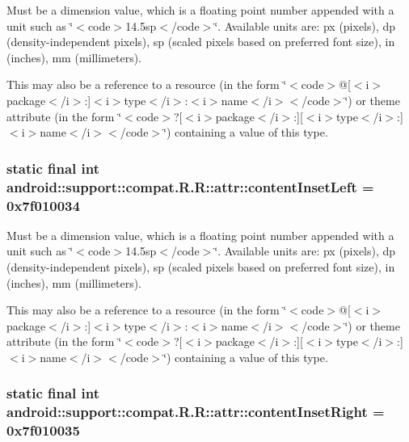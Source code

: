 Must be a dimension value, which is a floating point number appended with a unit such as \char`\"{}$<$code$>$14.5sp$<$/code$>$\char`\"{}. Available units are: px (pixels), dp (density-independent pixels), sp (scaled pixels based on preferred font size), in (inches), mm (millimeters). 

This may also be a reference to a resource (in the form \char`\"{}$<$code$>$@\mbox{[}$<$i$>$package$<$/i$>$:\mbox{]}$<$i$>$type$<$/i$>$:$<$i$>$name$<$/i$>$$<$/code$>$\char`\"{}) or theme attribute (in the form \char`\"{}$<$code$>$?\mbox{[}$<$i$>$package$<$/i$>$:\mbox{]}\mbox{[}$<$i$>$type$<$/i$>$:\mbox{]}$<$i$>$name$<$/i$>$$<$/code$>$\char`\"{}) containing a value of this type. \hypertarget{classandroid_1_1support_1_1compat_1_1_r_1_1attr_fd7e086b16b8e1c5b64b3a517fb1eea8}{
\subsubsection[{contentInsetLeft}]{\setlength{\rightskip}{0pt plus 5cm}static final int android::support::compat.R.R::attr::contentInsetLeft = 0x7f010034}}
\label{classandroid_1_1support_1_1compat_1_1_r_1_1attr_fd7e086b16b8e1c5b64b3a517fb1eea8}


Must be a dimension value, which is a floating point number appended with a unit such as \char`\"{}$<$code$>$14.5sp$<$/code$>$\char`\"{}. Available units are: px (pixels), dp (density-independent pixels), sp (scaled pixels based on preferred font size), in (inches), mm (millimeters). 

This may also be a reference to a resource (in the form \char`\"{}$<$code$>$@\mbox{[}$<$i$>$package$<$/i$>$:\mbox{]}$<$i$>$type$<$/i$>$:$<$i$>$name$<$/i$>$$<$/code$>$\char`\"{}) or theme attribute (in the form \char`\"{}$<$code$>$?\mbox{[}$<$i$>$package$<$/i$>$:\mbox{]}\mbox{[}$<$i$>$type$<$/i$>$:\mbox{]}$<$i$>$name$<$/i$>$$<$/code$>$\char`\"{}) containing a value of this type. \hypertarget{classandroid_1_1support_1_1compat_1_1_r_1_1attr_9940769a96023400f1c7a337ea2ffbc2}{
\subsubsection[{contentInsetRight}]{\setlength{\rightskip}{0pt plus 5cm}static final int android::support::compat.R.R::attr::contentInsetRight = 0x7f010035}}
\label{classandroid_1_1support_1_1compat_1_1_r_1_1attr_9940769a96023400f1c7a337ea2ffbc2}


